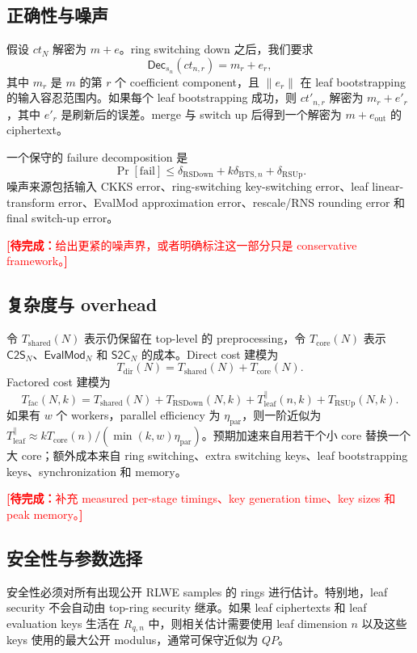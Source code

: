 \documentclass[UTF8,11pt]{article}
\newcommand{\todo}[1]{\textcolor{red}{\textbf{[待完成：}#1\textbf{]}}}
\newcommand{\CtwoS}{\mathsf{C2S}}
\newcommand{\StwoC}{\mathsf{S2C}}
\newcommand{\EvalMod}{\mathsf{EvalMod}}
\newcommand{\Dec}{\mathsf{Dec}}
\theoremstyle{definition}
\theoremstyle{plain}
\begin{document}
\subsection{正确性与噪声}
假设 $ct_N$ 解密为 $m+e$。ring switching down 之后，我们要求
\[
\Dec_{s_n}(ct_{n,r})=m_r+e_r,
\]
其中 $m_r$ 是 $m$ 的第 $r$ 个 coefficient component，且 $\|e_r\|$ 在 leaf bootstrapping 的输入容忍范围内。如果每个 leaf bootstrapping 成功，则 $ct'_{n,r}$ 解密为 $m_r+e'_r$，其中 $e'_r$ 是刷新后的误差。merge 与 switch up 后得到一个解密为 $m+e_{\mathrm{out}}$ 的 ciphertext。

一个保守的 failure decomposition 是
\[
\Pr[\mathrm{fail}]\le \delta_{\mathrm{RSDown}}+k\delta_{\mathrm{BTS},n}+\delta_{\mathrm{RSUp}}.
\]
噪声来源包括输入 CKKS error、ring-switching key-switching error、leaf linear-transform error、EvalMod approximation error、rescale/RNS rounding error 和 final switch-up error。

\todo{给出更紧的噪声界，或者明确标注这一部分只是 conservative framework。}

\subsection{复杂度与 overhead}
令 $T_{\mathrm{shared}}(N)$ 表示仍保留在 top-level 的 preprocessing，令 $T_{\mathrm{core}}(N)$ 表示 $\CtwoS_N$、$\EvalMod_N$ 和 $\StwoC_N$ 的成本。Direct cost 建模为
\[
T_{\mathrm{dir}}(N)=T_{\mathrm{shared}}(N)+T_{\mathrm{core}}(N).
\]
Factored cost 建模为
\[
T_{\mathrm{fac}}(N,k)=T_{\mathrm{shared}}(N)+T_{\mathrm{RSDown}}(N,k)+T_{\mathrm{leaf}}^{\parallel}(n,k)+T_{\mathrm{RSUp}}(N,k).
\]
如果有 $w$ 个 workers，parallel efficiency 为 $\eta_{\mathrm{par}}$，则一阶近似为
$T_{\mathrm{leaf}}^{\parallel}\approx kT_{\mathrm{core}}(n)/(\min(k,w)\eta_{\mathrm{par}})$。预期加速来自用若干个小 core 替换一个大 core；额外成本来自 ring switching、extra switching keys、leaf bootstrapping keys、synchronization 和 memory。

\todo{补充 measured per-stage timings、key generation time、key sizes 和 peak memory。}

\subsection{安全性与参数选择}
安全性必须对所有出现公开 RLWE samples 的 rings 进行估计。特别地，leaf security 不会自动由 top-ring security 继承。如果 leaf ciphertexts 和 leaf evaluation keys 生活在 $R_{q,n}$ 中，则相关估计需要使用 leaf dimension $n$ 以及这些 keys 使用的最大公开 modulus，通常可保守近似为 $QP$。
\end{document}
